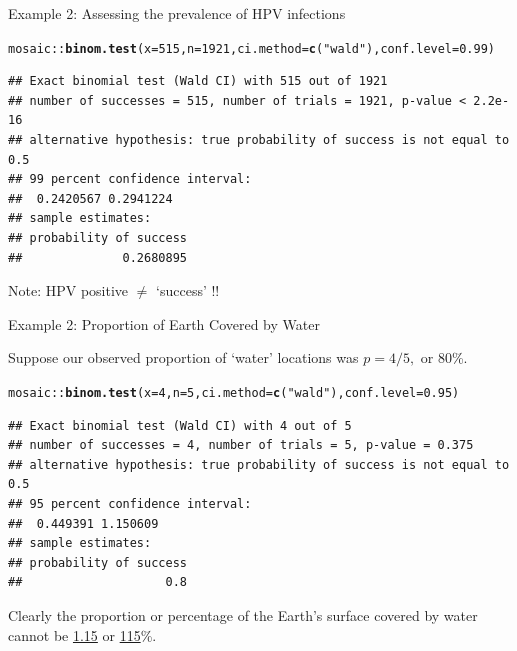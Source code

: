 \documentclass[10pt,handout]{beamer}\usepackage[]{graphicx}\usepackage[]{color}
\makeatletter
\newcommand{\hlnum}[1]{\textcolor[rgb]{0.686,0.059,0.569}{#1}}%
\newcommand{\hlstr}[1]{\textcolor[rgb]{0.192,0.494,0.8}{#1}}%
\newcommand{\hlopt}[1]{\textcolor[rgb]{0,0,0}{#1}}%
\newcommand{\hlstd}[1]{\textcolor[rgb]{0.345,0.345,0.345}{#1}}%
\newcommand{\hlkwc}[1]{\textcolor[rgb]{0.333,0.667,0.333}{#1}}%
\newcommand{\hlkwd}[1]{\textcolor[rgb]{0.737,0.353,0.396}{\textbf{#1}}}%
\newenvironment{kframe}{%
 \def\at@end@of@kframe{}%
 \ifinner\ifhmode%
  \def\at@end@of@kframe{\end{minipage}}%
  \begin{minipage}{\columnwidth}%
 \fi\fi%
 \def\FrameCommand##1{\hskip\@totalleftmargin \hskip-\fboxsep
 \colorbox{shadecolor}{##1}\hskip-\fboxsep
     \hskip-\linewidth \hskip-\@totalleftmargin \hskip\columnwidth}%
 \MakeFramed {\advance\hsize-\width
   \@totalleftmargin\z@ \linewidth\hsize
   \@setminipage}}%
 {\par\unskip\endMakeFramed%
 \at@end@of@kframe}
\newenvironment{knitrout}{}{} %
\makeatother
\begin{document}
\begin{frame}[fragile]{Example 2: Assessing the prevalence of HPV infections}
	
\begin{knitrout}\tiny
{}\color{fgcolor}\begin{kframe}
\begin{alltt}
\hlstd{mosaic}\hlopt{::}\hlkwd{binom.test}\hlstd{(}\hlkwc{x} \hlstd{=} \hlnum{515}\hlstd{,} \hlkwc{n} \hlstd{=} \hlnum{1921}\hlstd{,} \hlkwc{ci.method}\hlstd{=}\hlkwd{c}\hlstd{(}\hlstr{"wald"}\hlstd{),} \hlkwc{conf.level}\hlstd{=}\hlnum{0.99}\hlstd{)}
\end{alltt}
\begin{verbatim}
## Exact binomial test (Wald CI) with 515 out of 1921 
## number of successes = 515, number of trials = 1921, p-value < 2.2e-16
## alternative hypothesis: true probability of success is not equal to 0.5 
## 99 percent confidence interval:
##  0.2420567 0.2941224 
## sample estimates:
## probability of success 
##              0.2680895
\end{verbatim}
\end{kframe}
\end{knitrout}
	Note: HPV positive $\ne$ `success' !!
\end{frame}



\begin{frame}[fragile]{Example 2: Proportion of Earth Covered by Water}
	
	Suppose our observed proportion of `water' locations was $p = 4/5,$ or 80\%.
	
\begin{knitrout}\tiny
{}\color{fgcolor}\begin{kframe}
\begin{alltt}
\hlstd{mosaic}\hlopt{::}\hlkwd{binom.test}\hlstd{(}\hlkwc{x} \hlstd{=} \hlnum{4}\hlstd{,} \hlkwc{n} \hlstd{=} \hlnum{5}\hlstd{,} \hlkwc{ci.method}\hlstd{=}\hlkwd{c}\hlstd{(}\hlstr{"wald"}\hlstd{),} \hlkwc{conf.level}\hlstd{=}\hlnum{0.95}\hlstd{)}
\end{alltt}
\begin{verbatim}
## Exact binomial test (Wald CI) with 4 out of 5 
## number of successes = 4, number of trials = 5, p-value = 0.375
## alternative hypothesis: true probability of success is not equal to 0.5 
## 95 percent confidence interval:
##  0.449391 1.150609 
## sample estimates:
## probability of success 
##                    0.8
\end{verbatim}
\end{kframe}
\end{knitrout}
	
	\pause 
	
	Clearly  the proportion or percentage of the Earth's surface covered by water cannot
	be \underline{1.15} or \underline{115}\%.  
	
\end{frame}
\end{document}
